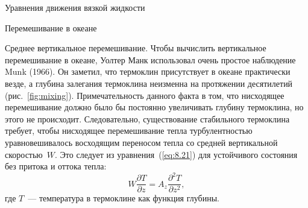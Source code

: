 \begin{chapter}{Уравнения движения вязкой жидкости}
\begin{section}{Перемешивание в океане}
\begin{paragraph}{Среднее вертикальное перемешивание.}
Чтобы вычислить вертикальное перемешивание в океане, Уолтер Манк использовал 
очень простое наблюдение Munk (1966). Он заметил, что 
термоклин присутствует в океане практически везде, 
а глубина залегания термоклина неизменна на протяжении
десятилетий (рис.~\ref{fig:mixing}). Примечательность данного факта в том, что
нисходящее перемешивание должно было бы постоянно увеличивать глубину 
термоклина, но этого не происходит. Следовательно, существование стабильного 
термоклина требует, чтобы нисходящее перемешивание тепла 
турбулентностью уравновешивалось восходящим
переносом тепла со средней вертикальной
скоростью~$W$. Это следует из уравнения~(\ref{eq:8.21}) для устойчивого 
состояния без притока и оттока тепла:
\begin{equation}
 W \frac{\partial T}{\partial z} = A_z \frac{\partial^2 T}{\partial z^2},
\end{equation}
где $T$~--- температура в термоклине как функция глубины.
%


\end{paragraph}
\end{section}
\end{chapter}
